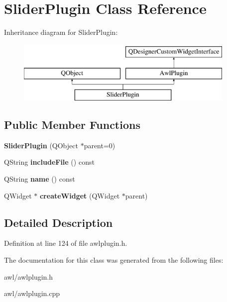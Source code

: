 \hypertarget{class_slider_plugin}{}\section{Slider\+Plugin Class Reference}
\label{class_slider_plugin}
Inheritance diagram for Slider\+Plugin\+:\begin{figure}[H]
\begin{center}
\leavevmode
\includegraphics[height=3.000000cm]{class_slider_plugin}
\end{center}
\end{figure}
\subsection*{Public Member Functions}
\begin{DoxyCompactItemize}
\item 
\mbox{\label{class_slider_plugin_a42fb652282e8c271b97809e5d96e647a}} 
{\bfseries Slider\+Plugin} (Q\+Object $\ast$parent=0)
\item 
\mbox{\label{class_slider_plugin_aa31a12240dd4b7738036af8434dca637}} 
Q\+String {\bfseries include\+File} () const
\item 
\mbox{\label{class_slider_plugin_a2079bac07fb9bb9c8ade63960368dd8b}} 
Q\+String {\bfseries name} () const
\item 
\mbox{\label{class_slider_plugin_ab2fb1b8a5aabb10b82d669aab27aae1c}} 
Q\+Widget $\ast$ {\bfseries create\+Widget} (Q\+Widget $\ast$parent)
\end{DoxyCompactItemize}


\subsection{Detailed Description}


Definition at line 124 of file awlplugin.\+h.



The documentation for this class was generated from the following files\+:\begin{DoxyCompactItemize}
\item 
awl/awlplugin.\+h\item 
awl/awlplugin.\+cpp\end{DoxyCompactItemize}
